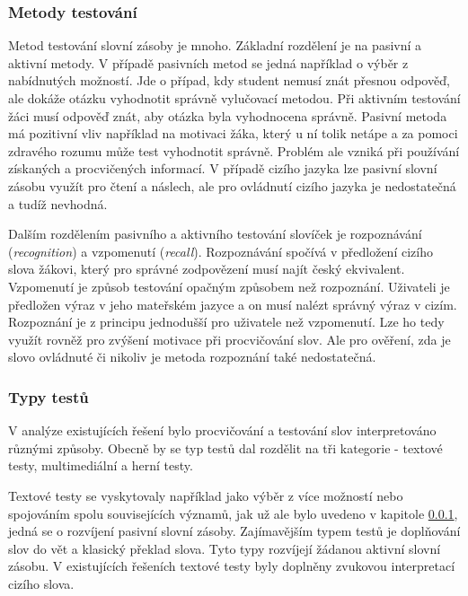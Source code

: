 \documentclass[a4paper,11pt,titlepage,fleqn]{article}
\begin{document}
        \subsubsection{Metody testování}
            \label{test-methods}

            Metod testování slovní zásoby je mnoho. Základní rozdělení je na pasivní a aktivní metody. V případě pasivních metod se jedná například o výběr z nabídnutých možností. Jde o případ, kdy student nemusí znát přesnou odpověď, ale dokáže otázku vyhodnotit správně vylučovací metodou. Při aktivním testování žáci musí odpověď znát, aby otázka byla vyhodnocena správně. Pasivní metoda má pozitivní vliv například na motivaci žáka, který u ní tolik netápe a za pomoci zdravého rozumu může test vyhodnotit správně. Problém ale vzniká při používání získaných a procvičených informací. V případě cizího jazyka lze pasivní slovní zásobu využít pro čtení a náslech, ale pro ovládnutí cizího jazyka je nedostatečná a tudíž nevhodná. 

            Dalším rozdělením pasivního a aktivního testování slovíček je rozpoznávání (\textit{recognition}) a vzpomenutí (\textit{recall}). Rozpoznávání spočívá v předložení cizího slova žákovi, který pro správné zodpovězení musí najít český ekvivalent. Vzpomenutí je způsob testování opačným způsobem než rozpoznání. Uživateli je předložen výraz v jeho mateřském jazyce a on musí nalézt správný výraz v cizím. Rozpoznání je z principu jednodušší pro uživatele než vzpomenutí. Lze ho tedy využít rovněž pro zvýšení motivace při procvičování slov. Ale pro ověření, zda je slovo ovládnuté či nikoliv je metoda rozpoznání také nedostatečná.

            \subsubsection{Typy testů}

                V analýze existujících řešení bylo procvičování a testování slov interpretováno různými způsoby. Obecně by se typ testů dal rozdělit na tři kategorie - textové testy, multimediální a herní testy.

                Textové testy se vyskytovaly například jako výběr z více možností nebo spojováním spolu souvisejících významů, jak už ale bylo uvedeno v kapitole \ref{test-methods}, jedná se o rozvíjení pasivní slovní zásoby. Zajímavějším typem testů je doplňování slov do vět a klasický překlad slova. Tyto typy rozvíjejí žádanou aktivní slovní zásobu. V existujících řešeních textové testy byly doplněny zvukovou interpretací cizího slova.
\end{document}
